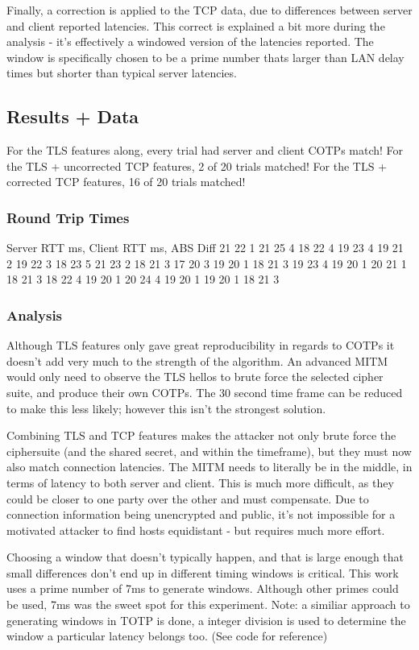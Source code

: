 \documentclass[a4paper, 11pt]{article} 				%
\begin{document}
Finally, a correction is applied to the TCP data, due to differences between server and client reported latencies. This correct is explained a bit more during the analysis - it's effectively a windowed version of the latencies reported. The window is specifically chosen to be a prime number thats larger than LAN delay times but shorter than typical server latencies.

\subsection{Results + Data}
For the TLS features along, every trial had server and client COTPs match! 
For the TLS + uncorrected TCP features, 2 of 20 trials matched!
For the TLS + corrected TCP features, 16 of 20 trials matched!

\subsubsection{Round Trip Times}
Server RTT ms, Client RTT ms, ABS Diff
21	22	1
21	25	4
18	22	4
19	23	4
19	21	2
19	22	3
18	23	5
21	23	2
18	21	3
17	20	3
19	20	1
18	21	3
19	23	4
19	20	1
20	21	1
18	21	3
18	22	4
19	20	1
20	24	4
19	20	1
19	20	1
18	21	3


\subsubsection{Analysis}
Although TLS features only gave great reproducibility in regards to COTPs it doesn't add very much to the strength of the algorithm. An advanced MITM would only need to observe the TLS hellos to brute force the selected cipher suite, and produce their own COTPs. The 30 second time frame can be reduced to make this less likely; however this isn't the strongest solution.

Combining TLS and TCP features makes the attacker not only brute force the ciphersuite (and the shared secret, and within the timeframe), but they must now also match connection latencies. The MITM needs to literally be in the middle, in terms of latency to both server and client. This is much more difficult, as they could be closer to one party over the other and must compensate. Due to connection information being unencrypted and public, it's not impossible for a motivated attacker to find hosts equidistant - but requires much more effort.

Choosing a window that doesn't typically happen, and that is large enough that small differences don't end up in different timing windows is critical. This work uses a prime number of 7ms to generate windows. Although other primes could be used, 7ms was the sweet spot for this experiment. Note: a similiar approach to generating windows in TOTP is done, a integer division is used to determine the window a particular latency belongs too. (See code for reference)
\end{document}
